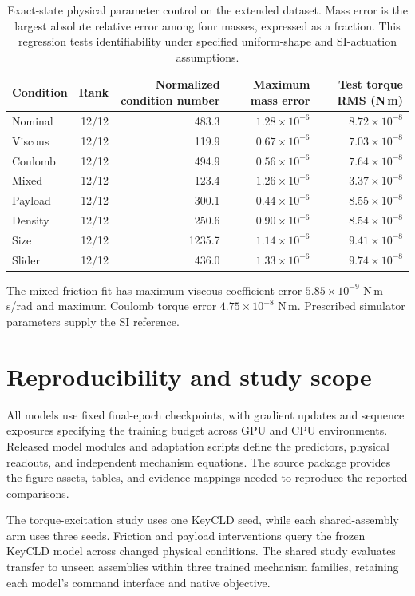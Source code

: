 \begin{table}[t]
\caption{Exact-state physical parameter control on the extended dataset. Mass error is the largest absolute relative error among four masses, expressed as a fraction. This regression tests identifiability under specified uniform-shape and SI-actuation assumptions.}
\centering
\small
\begin{tabular}{lrrrr}
\toprule
Condition & Rank & Normalized condition number & Maximum mass error & Test torque RMS (N\,m)\\
\midrule
Nominal & 12/12 & 483.3 & $1.28\!\times\!10^{-6}$ & $8.72\!\times\!10^{-8}$ \\
Viscous & 12/12 & 119.9 & $0.67\!\times\!10^{-6}$ & $7.03\!\times\!10^{-8}$ \\
Coulomb & 12/12 & 494.9 & $0.56\!\times\!10^{-6}$ & $7.64\!\times\!10^{-8}$ \\
Mixed & 12/12 & 123.4 & $1.26\!\times\!10^{-6}$ & $3.37\!\times\!10^{-8}$ \\
Payload & 12/12 & 300.1 & $0.44\!\times\!10^{-6}$ & $8.55\!\times\!10^{-8}$ \\
Density & 12/12 & 250.6 & $0.90\!\times\!10^{-6}$ & $8.54\!\times\!10^{-8}$ \\
Size & 12/12 & 1235.7 & $1.14\!\times\!10^{-6}$ & $9.41\!\times\!10^{-8}$ \\
Slider & 12/12 & 436.0 & $1.33\!\times\!10^{-6}$ & $9.74\!\times\!10^{-8}$ \\
\bottomrule
\end{tabular}
\end{table}

The mixed-friction fit has maximum viscous coefficient error $5.85\times10^{-9}$ N\,m\,s/rad and maximum Coulomb torque error $4.75\times10^{-8}$ N\,m. Prescribed simulator parameters supply the SI reference.

\section{Reproducibility and study scope}
\label{app:reproducibility}
All models use fixed final-epoch checkpoints, with gradient updates and sequence exposures specifying the training budget across GPU and CPU environments. Released model modules and adaptation scripts define the predictors, physical readouts, and independent mechanism equations. The source package provides the figure assets, tables, and evidence mappings needed to reproduce the reported comparisons.

The torque-excitation study uses one KeyCLD seed, while each shared-assembly arm uses three seeds. Friction and payload interventions query the frozen KeyCLD model across changed physical conditions. The shared study evaluates transfer to unseen assemblies within three trained mechanism families, retaining each model's command interface and native objective.

